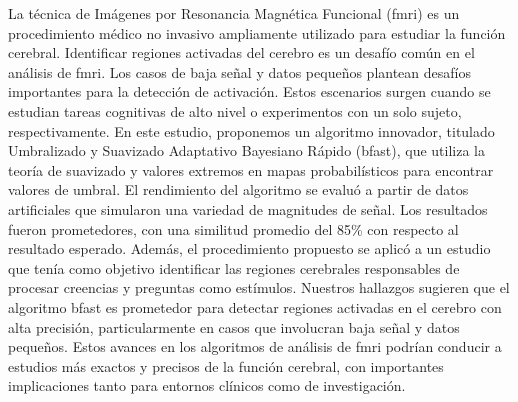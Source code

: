 La técnica de Imágenes por Resonancia Magnética Funcional (\acrshort{fmri}) 
es un procedimiento médico no invasivo ampliamente utilizado para estudiar 
la función cerebral. Identificar regiones activadas del cerebro es un desafío 
común en el análisis de \acrshort{fmri}. Los casos de baja señal y datos 
pequeños plantean desafíos importantes para la detección de activación. 
Estos escenarios surgen cuando se estudian tareas cognitivas de alto nivel o 
experimentos con un solo sujeto, respectivamente. En este estudio, proponemos 
un algoritmo innovador, titulado Umbralizado y Suavizado Adaptativo 
Bayesiano Rápido (\acrshort{bfast}), que utiliza la teoría de suavizado 
y valores extremos en mapas probabilísticos para encontrar valores de 
umbral. El rendimiento del algoritmo se evaluó a partir de datos artificiales 
que simularon una variedad de magnitudes de señal. Los resultados fueron 
prometedores, con una similitud promedio del 85\% con respecto al resultado 
esperado. Además, el procedimiento propuesto se aplicó a un estudio que tenía 
como objetivo identificar las regiones cerebrales responsables de procesar 
creencias y preguntas como estímulos. Nuestros hallazgos sugieren que el 
algoritmo \acrshort{bfast} es prometedor para detectar regiones activadas 
en el cerebro con alta precisión, particularmente en casos que involucran 
baja señal y datos pequeños. Estos avances en los algoritmos de análisis 
de \acrshort{fmri} podrían conducir a estudios más exactos y precisos de la 
función cerebral, con importantes implicaciones tanto para entornos clínicos 
como de investigación.